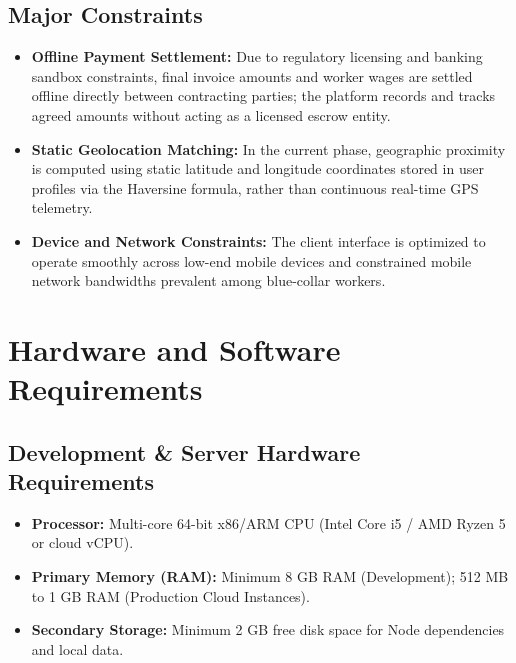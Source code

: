 \subsection{Major Constraints}
\begin{itemize}
    \item \textbf{Offline Payment Settlement:} Due to regulatory licensing and banking sandbox constraints, final invoice amounts and worker wages are settled offline directly between contracting parties; the platform records and tracks agreed amounts without acting as a licensed escrow entity.
    \item \textbf{Static Geolocation Matching:} In the current phase, geographic proximity is computed using static latitude and longitude coordinates stored in user profiles via the Haversine formula, rather than continuous real-time GPS telemetry.
    \item \textbf{Device and Network Constraints:} The client interface is optimized to operate smoothly across low-end mobile devices and constrained mobile network bandwidths prevalent among blue-collar workers.
\end{itemize}

\section{Hardware and Software Requirements}
\subsection{Development \& Server Hardware Requirements}
\begin{itemize}
    \item \textbf{Processor:} Multi-core 64-bit x86/ARM CPU (Intel Core i5 / AMD Ryzen 5 or cloud vCPU).
    \item \textbf{Primary Memory (RAM):} Minimum 8 GB RAM (Development); 512 MB to 1 GB RAM (Production Cloud Instances).
    \item \textbf{Secondary Storage:} Minimum 2 GB free disk space for Node dependencies and local data.
\end{itemize}

